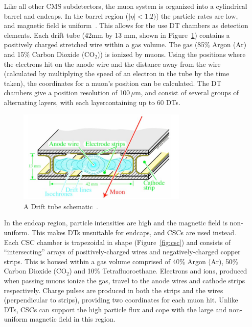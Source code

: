 Like all other CMS subdetectors, the muon system is organized into a cylindrical barrel and endcaps. In the barrel region ($|\eta|<1.2)$) the particle rates are low, and magnetic field is uniform~\cite{cms_exp_ref}. This allows for the use DT chambers as detection elements. Each drift tube (42mm by 13 mm, shown in Figure~\ref{fig:drift_tube}) contains a positively charged stretched wire within a gas volume. The gas (85\% Argon (Ar) and 15\% Carbon Dioxide ($\mathrm{CO}_{2}$)) is ionized by muons. Using the positions where the electrons hit on the anode wire and the distance away from the wire (calculated by multiplying the speed of an electron in the tube by the time taken), the coordinates for a muon's position can be calculated. The DT chambers give a position resolution of 100\,$\mu$m, and consist of several groups of alternating layers, with each layercontaining up to 60 DTs.      

\begin{figure}
\begin{center}
  \includegraphics[width=0.75\textwidth,keepaspectratio]{plots_and_figures/chapter3/drift_tube.png}
\caption{A Drift tube schematic~\cite{cms_exp_ref}.}
\label{fig:drift_tube}
\end{center}
\end{figure}

In the endcap region, particle intensities are high and the magnetic field is non-uniform. This makes DTs unsuitable for endcaps, and CSCs are used instead. Each CSC chamber is trapezoidal in shape (Figure~\ref{fig:csc}) and consists of ``intersecting'' arrays of positively-charged wires and  negatively-charged copper strips. This is housed within a gas volume comprised of 40\% Argon (Ar), 50\% Carbon Dioxide ($\mathrm{CO}_{2}$) and 10\% Tetrafluoroethane. Electrons and ions, produced when passing muons ionize the gas, travel to the anode wires and cathode strips respectively. Charge pulses are produced in both the strips and the wires (perpendicular to strips), providing two coordinates for each muon hit. Unlike DTs, CSCs can support the high particle flux and cope with the large and non-uniform magnetic field in this region.


